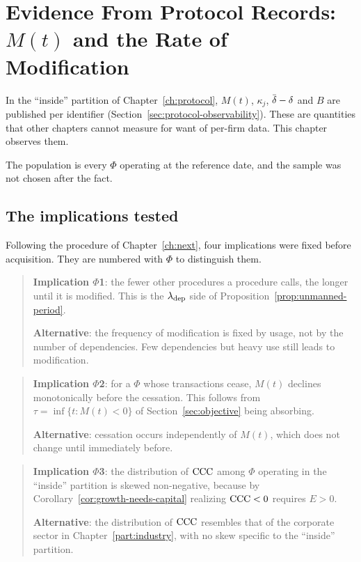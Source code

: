 \chapter{Evidence From Protocol Records: \texorpdfstring{$M(t)$}{M(t)} and the Rate of Modification}
\label{ch:protocol-emp}

In the ``inside'' partition of Chapter~\ref{ch:protocol}, $M(t)$, $\kappa_j$, $\dbar-\delta$
and $B$ are published per identifier (Section~\ref{sec:protocol-observability}). These are
quantities that other chapters cannot measure for want of per-firm data. This chapter
observes them.

The population is every $\Phi$ operating at the reference date, and the sample was not chosen
after the fact.

\section{The implications tested}
\label{sec:protocol-predictions}

Following the procedure of Chapter~\ref{ch:next}, four implications were fixed before
acquisition. They are numbered with $\Phi$ to distinguish them.

\begin{quote}
\textbf{Implication $\Phi$1}: the fewer other procedures a procedure calls, the longer until
it is modified. This is the $\lambda_{\rm dep}$ side of
Proposition~\ref{prop:unmanned-period}.

\textbf{Alternative}: the frequency of modification is fixed by usage, not by the number of
dependencies. Few dependencies but heavy use still leads to modification.
\end{quote}

\begin{quote}
\textbf{Implication $\Phi$2}: for a $\Phi$ whose transactions cease, $M(t)$ declines
monotonically before the cessation. This follows from $\tau=\inf\{t:M(t)<0\}$ of
Section~\ref{sec:objective} being absorbing.

\textbf{Alternative}: cessation occurs independently of $M(t)$, which does not change until
immediately before.
\end{quote}

\begin{quote}
\textbf{Implication $\Phi$3}: the distribution of $\mathrm{CCC}$ among $\Phi$ operating in the
``inside'' partition is skewed non-negative, because by
Corollary~\ref{cor:growth-needs-capital} realizing $\mathrm{CCC}<0$ requires $E>0$.

\textbf{Alternative}: the distribution of $\mathrm{CCC}$ resembles that of the corporate sector in
Chapter~\ref{part:industry}, with no skew specific to the ``inside'' partition.
\end{quote}

